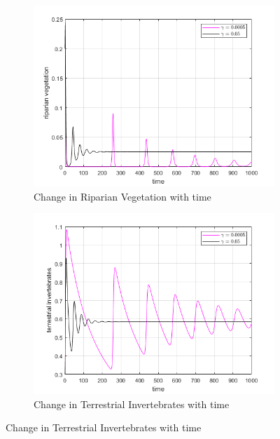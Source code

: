 \documentclass[12pt]{article}
\numberwithin{equation}{section}
\begin{document}
\FloatBarrier
\begin{figure}[bp!]
	\centering
	\begin{subfigure}[t]{0.45\textwidth}
		\centering
	\includegraphics[width=\textwidth]{time_vs_riparian_gamma.png}
		\caption{Change in Riparian Vegetation with time} \label{fig:time_vs_riparian_gamma}
	\end{subfigure}
\hspace{0.08\textwidth}
        \begin{subfigure}[t]{0.45\textwidth}
                 \centering
         \includegraphics[width=\textwidth]{time_vs_invertebrates_gamma.png}
		\caption{Change in Terrestrial Invertebrates with time} \label{fig:time_vs_invertebrates_gamma}

\end{subfigure}
\end{figure}
\end{document}
